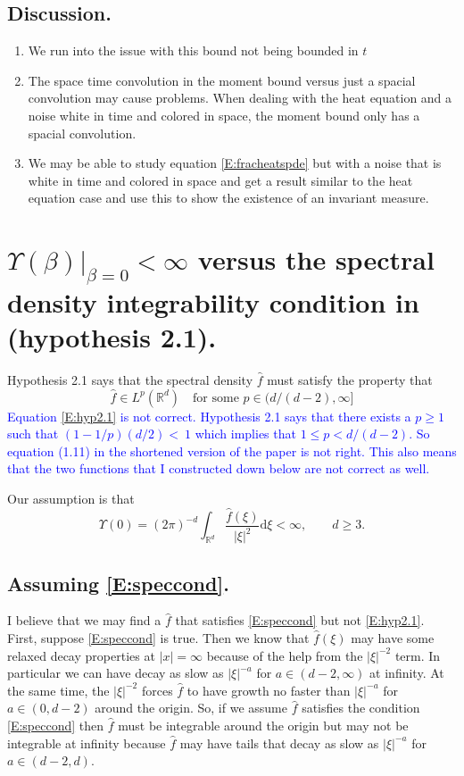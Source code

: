 \documentclass{article}
\numberwithin{equation}{section}
\newcommand{\R}{\mathbb{R}}
\newcommand{\ud}{\ensuremath{\mathrm{d}}}
\begin{document}
\subsection{Discussion.}
	\begin{enumerate}
		\item We run into the issue with this bound not being bounded in $t$
		\item The space time convolution in the moment bound versus just a spacial convolution may cause problems. When dealing with the heat equation and a noise white in time and colored in space, the moment bound only has a spacial convolution.
		\item We may be able to study equation \eqref{E:fracheatspde} but with a noise that is white in time and colored in space and get a result similar to the heat equation case and use this to show the existence of an invariant measure.
	\end{enumerate}

\section{$\Upsilon(\beta) \vert_{\beta =0} < \infty$ versus the spectral density integrability condition in \cite{TZ98} (hypothesis 2.1).}
Hypothesis 2.1 \cite{TZ98} says that the spectral density $\hat{f}$ must satisfy the property that
	\begin{equation}\label{E:hyp2.1}
 \hat{f} \in L^p(\R^d) \quad \text{for some } p \in (d/(d-2), \infty]
 	\end{equation}
 \textcolor{blue}{Equation \eqref{E:hyp2.1} is not correct. Hypothesis 2.1 \cite{TZ98} says that there exists a $p \ge 1$ such that $(1-1/p)(d/2) <\ 1$ which implies that $1 \le p < d/(d-2)$. So equation (1.11) in the shortened version of the paper is not right. This also means that the two functions that I constructed down below are not correct as well.}

Our assumption is that
	\begin{equation}\label{E:speccond}
		\Upsilon(0) = (2\pi)^{-d} \int_{\R^d} \frac{\hat{f}(\xi)}{|\xi|^2} \ud \xi < \infty, \quad \quad d \ge 3.
	\end{equation}

\subsection{Assuming \eqref{E:speccond}.}

I believe that we may find a $\hat{f}$ that satisfies \eqref{E:speccond} but not \eqref{E:hyp2.1}. First, suppose \eqref{E:speccond} is true. Then we know that $\hat{f}(\xi)$ may have some relaxed decay properties at $|x| = \infty$ because of the help from the $|\xi|^{-2}$ term. In particular we can have decay as slow as $|\xi|^{-a}$ for $a \in (d-2,\infty)$ at infinity. At the same time, the $|\xi|^{-2}$ forces $\hat{f}$ to have growth no faster than $|\xi|^{-a}$ for $a \in (0,d-2)$ around the origin. So, if we assume $\hat{f}$ satisfies the condition \eqref{E:speccond} then $\hat{f}$ must be integrable around the origin but may not be integrable at infinity because $\hat{f}$ may have tails that decay as slow as $|\xi|^{-a}$ for $a \in (d-2,d)$.
\end{document}
